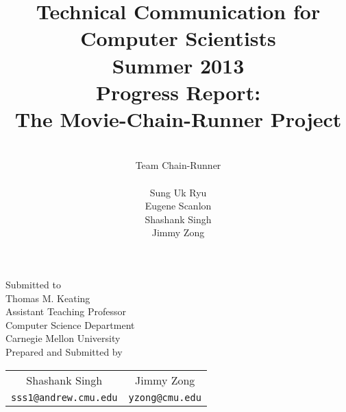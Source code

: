 \documentclass[11pt,english]{article}
\title{
{\normalsize \bf Technical Communication for Computer Scientists\\
Summer 2013}\\
\vspace{4cm}
{\bf Progress Report:\\The Movie-Chain-Runner Project}}
\author{
\\Team Chain-Runner \\\\
Sung Uk Ryu\\
Eugene Scanlon\\
Shashank Singh\\
Jimmy Zong
}
\begin{document}
\begin{titlepage}
\maketitle
\vfill
\begin{center}
Submitted to\\
Thomas M. Keating\\
Assistant Teaching Professor\\
Computer Science Department\\
Carnegie Mellon University\\
\vspace{1cm}
Prepared and Submitted by\\
\vspace{0.5cm}

\begin{tabular}{cc}
Shashank Singh \hspace{2cm} & Jimmy Zong \\
\texttt{sss1@andrew.cmu.edu} \hspace{2cm} & \texttt{yzong@cmu.edu}
\end{tabular}
\end{center}
\end{titlepage}
\end{document}
